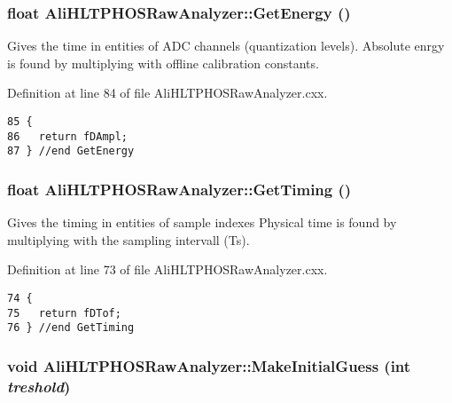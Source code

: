 \subsubsection{\setlength{\rightskip}{0pt plus 5cm}float Ali\-HLTPHOSRaw\-Analyzer::Get\-Energy ()\hspace{0.3cm}{\tt  [inherited]}}\label{classAliHLTPHOSRawAnalyzer_AliHLTPHOSRawAnalyzerPeakFindera11}


Gives the time in entities of ADC channels (quantization levels). Absolute enrgy is found by multiplying with offline calibration constants. 

Definition at line 84 of file Ali\-HLTPHOSRaw\-Analyzer.cxx.

\footnotesize\begin{verbatim}85 {
86   return fDAmpl;
87 } //end GetEnergy
\end{verbatim}\normalsize 


\subsubsection{\setlength{\rightskip}{0pt plus 5cm}float Ali\-HLTPHOSRaw\-Analyzer::Get\-Timing ()\hspace{0.3cm}{\tt  [inherited]}}\label{classAliHLTPHOSRawAnalyzer_AliHLTPHOSRawAnalyzerPeakFindera10}


Gives the timing in entities of sample indexes Physical time is found by multiplying with the sampling intervall (Ts). 

Definition at line 73 of file Ali\-HLTPHOSRaw\-Analyzer.cxx.

\footnotesize\begin{verbatim}74 {
75   return fDTof;
76 } //end GetTiming
\end{verbatim}\normalsize 


\subsubsection{\setlength{\rightskip}{0pt plus 5cm}void Ali\-HLTPHOSRaw\-Analyzer::Make\-Initial\-Guess (int {\em treshold})\hspace{0.3cm}{\tt  [inherited]}}\label{classAliHLTPHOSRawAnalyzer_AliHLTPHOSRawAnalyzerPeakFindera15}


